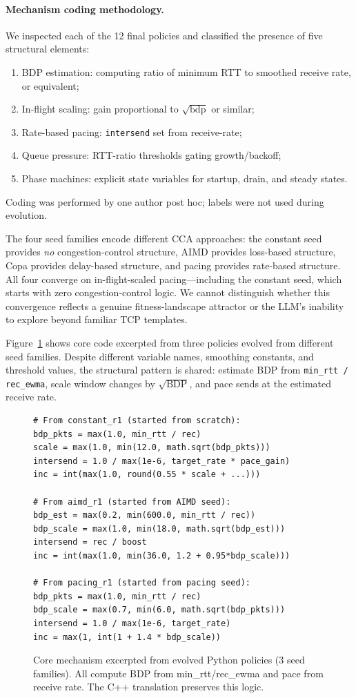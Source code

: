 \paragraph{Mechanism coding methodology.}
We inspected each of the 12 final policies and classified the
presence of five structural elements:
\begin{enumerate}
\item BDP estimation: computing ratio of minimum RTT
  to smoothed receive rate, or equivalent;
\item In-flight scaling: gain proportional to
  $\sqrt{\mathrm{bdp}}$ or similar;
\item Rate-based pacing: \texttt{intersend} set from receive-rate;
\item Queue pressure: RTT-ratio thresholds gating
  growth\slash backoff;
\item Phase machines: explicit state variables for startup,
  drain, and steady states.
\end{enumerate}
Coding was performed by one author post hoc; labels were not used
during evolution.

The four seed families encode different CCA approaches: the
constant seed provides \emph{no} congestion-control structure,
AIMD provides loss-based structure, Copa provides delay-based structure,
and pacing provides rate-based structure. All four converge on
in-flight-scaled pacing---including the constant seed, which starts with
zero congestion-control logic. We cannot distinguish whether this
convergence reflects a genuine fitness-landscape attractor or the LLM's
inability to explore beyond familiar TCP templates.

Figure~\ref{fig:mechanism} shows core code excerpted from three
policies evolved from different seed families. Despite different variable
names, smoothing constants, and threshold values, the structural pattern
is shared: estimate BDP from \texttt{min\_rtt / rec\_ewma}, scale
window changes by $\sqrt{\text{BDP}}$, and pace sends at the
estimated receive rate.

\begin{figure}[t]
\centering
\small
\begin{verbatim}
# From constant_r1 (started from scratch):
bdp_pkts = max(1.0, min_rtt / rec)
scale = max(1.0, min(12.0, math.sqrt(bdp_pkts)))
intersend = 1.0 / max(1e-6, target_rate * pace_gain)
inc = int(max(1.0, round(0.55 * scale + ...)))

# From aimd_r1 (started from AIMD seed):
bdp_est = max(0.2, min(600.0, min_rtt / rec))
bdp_scale = max(1.0, min(18.0, math.sqrt(bdp_est)))
intersend = rec / boost
inc = int(max(1.0, min(36.0, 1.2 + 0.95*bdp_scale)))

# From pacing_r1 (started from pacing seed):
bdp_pkts = max(1.0, min_rtt / rec)
bdp_scale = max(0.7, min(6.0, math.sqrt(bdp_pkts)))
intersend = 1.0 / max(1e-6, target_rate)
inc = max(1, int(1 + 1.4 * bdp_scale))
\end{verbatim}
\caption{Core mechanism excerpted from evolved Python policies (3 seed families). All compute BDP from min\_rtt/rec\_ewma and pace from receive rate. The C++ translation preserves this logic.}
\label{fig:mechanism}
\end{figure}



